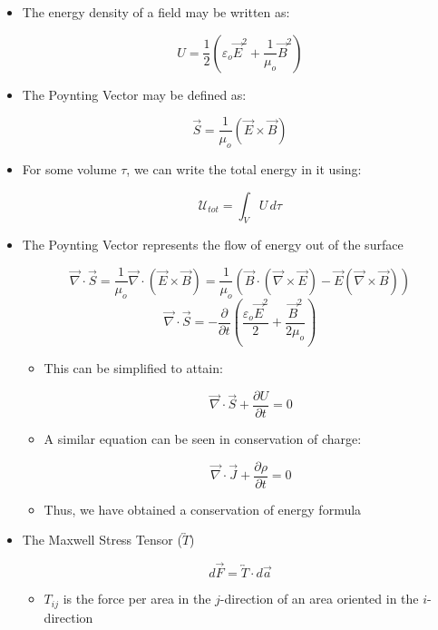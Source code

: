 \begin{itemize}

  \item The energy density of a field may be written as:

    $$U=\frac{1}{2}\left( \varepsilon_o\vec{E}^2+\frac{1}{\mu_o}\vec{B}^2 \right)$$

  \item The Poynting Vector may be defined as:

    $$\vec{S}=\frac{1}{\mu_o}(\vec{E}\times\vec{B})$$

  \item For some volume $\tau$, we can write the total energy in it using:

    $$\mathcal{U}_{tot}=\int_V U\,d\tau$$

  \item The Poynting Vector represents the flow of energy out of the surface

    $$\vec{\nabla}\cdot\vec{S}=\frac{1}{\mu_o}\vec{\nabla}\cdot(\vec{E}\times\vec{B})=\frac{1}{\mu_o}\left( \vec{B}\cdot(\vec{\nabla}\times\vec{E})-\vec{E}(\vec{\nabla}\times\vec{B}) \right)$$
    $$\vec{\nabla}\cdot\vec{S}=-\frac{\partial}{\partial t}\left( \frac{\varepsilon_o\vec{E}^2}{2}+\frac{\vec{B}^2}{2\mu_o} \right)$$

    \begin{itemize}

      \item This can be simplified to attain:

        $$\vec{\nabla}\cdot\vec{S}+\frac{\partial U}{\partial t}=0$$

      \item A similar equation can be seen in conservation of charge:

        $$\vec{\nabla}\cdot\vec{J}+\frac{\partial \rho}{\partial t}=0$$

      \item Thus, we have obtained a conservation of energy formula

    \end{itemize}

  \item The Maxwell Stress Tensor ($\overleftrightarrow{T}$)

    $$d\vec{F}=\overleftrightarrow{T}\cdot d\vec{a}$$

    \begin{itemize}

      \item $T_{ij}$ is the force per area in the $j$-direction of an area oriented in the $i$-direction


\end{itemize}
\end{itemize}
